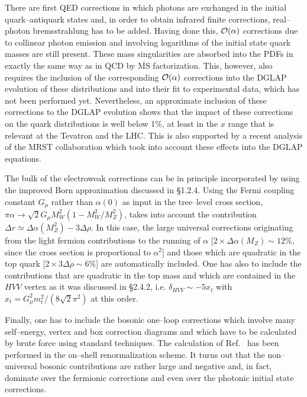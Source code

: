 There are first QED corrections in which photons are exchanged in the initial
quark--antiquark states and, in order to obtain infrared finite corrections,
real--photon bremsstrahlung has to be added. Having done this, ${\cal
O}(\alpha)$ corrections due to collinear photon emission and involving
logarithms of the initial state quark masses are still present. These mass
singularities are absorbed into the PDFs in exactly the same way as in QCD by
$\overline{\mbox{MS}}$ factorization.  This, however, also requires the
inclusion of the corresponding ${\cal O}(\alpha)$ corrections into the DGLAP
evolution of these distributions and into their fit to experimental data, which
has not been performed yet.  Nevertheless, an approximate inclusion of
these corrections to the DGLAP evolution shows \cite{Kripfganz} that the
impact of these corrections on the quark distributions is well below 1\%, at
least in the $x$ range that is relevant at the Tevatron and the LHC. This is
also supported by a recent analysis of the MRST collaboration \cite{Stirling}
which took into account these effects into the DGLAP equations. \s

The bulk of the electroweak corrections can be in principle incorporated by
using the improved Born approximation discussed in \S1.2.4. Using the Fermi
coupling constant $G_\mu$ rather than $\alpha(0)$ as input in the tree--level
cross section, $\pi \alpha \to  \sqrt{2} G_\mu M_W^2 ( 1- M_W^2/M_Z^2)$, takes
into account the contribution $\Delta r \simeq \Delta \alpha (M_Z^2) - 3\Delta
\rho$. In this case, the large universal corrections originating from the light
fermion contributions to the running of $\alpha$ [$2 \times \Delta \alpha (M_Z)
\sim 12\%$, since the cross section is proportional to $\alpha^2$] and those
which are quadratic in the top quark [$2 \times 3\Delta \rho  \sim 6\%$] are
automatically included. One has also to include the contributions that are
quadratic in the top mass and which are contained in  the $HVV$ vertex as it
was discussed in \S2.4.2, i.e.  $\delta_{HVV} \sim -5 x_t$ with $x_t= G_\mu^2
m_t^2/( 8 \sqrt{2} \pi^2)$ at this order. \s

Finally, one has to include the bosonic one--loop corrections which involve
many self--energy, vertex and box correction diagrams and which have to be
calculated by brute force using standard techniques. The calculation of
Ref.~\cite{pp-HV-EW} has been performed in the on--shell renormalization
scheme. It turns out that the non--universal bosonic contributions are rather
large and negative and, in fact, dominate over the fermionic corrections and
even over the photonic initial state corrections.  

